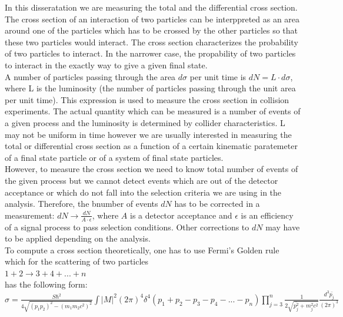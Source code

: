 In this disseratation we are measuring the total and the differential cross section.\\

The cross section of an interaction of two particles can be interppreted as an area around one of the particles which has to be crossed by the other particles so that these two particles would interact. 
The cross section characterizes the probability of two particles to interact. In the narrower case, the propability of two particles to interact in the exactly way to give a given final state.\\

A number of particles passing through the area $d\sigma$ per unit time is $dN=L \cdot d\sigma$, where L is the luminosity (the number of particles passing through the unit area per unit time). This expression is used to measure the cross section in collision experiments. The actual quantity which can be measured is a number of events of a given process and the luminosity is determined by collider characteristics. L may not be uniform in time however we are usually interested in measuring the total or differential cross section as a function of a certain kinematic paratemeter of a final state particle or of a system of final state particles.\\  
However, to measure the cross section we need to know total number of events of the given process but we cannot detect events which are out of the detector acceptance or which do not fall into the selection criteria we are using in the analysis. Therefore, the bnumber of events $dN$ has to be corrected in a measurement: $dN \rightarrow \frac{dN}{A \cdot \epsilon}$, where $A$ is a detector acceptance and $\epsilon$ is an efficiency of a signal process to pass selection conditions. Other corrections to $dN$ may have to be applied depending on the analysis.\\ 

To compute a cross section theoretically, one has to use Fermi's Golden rule which for the scattering of two particles\\
$1+2\rightarrow 3+4+...+n$\\
has the following form:\\

$\sigma = \frac{S \hbar^2 }{4\sqrt{(p_1p_2)^2-(m_1m_2c^2)^2}} \int |M|^2 (2\pi)^4 \delta^4(p_1+p_2-p_3-p_4-...-p_n) \prod_{j=3}^{n} \frac{1}{2 \sqrt{\bar{p_j^2}+m_j^2 c^2}}\frac{d^3\bar{p_j}}{(2\pi)^3} $\\

